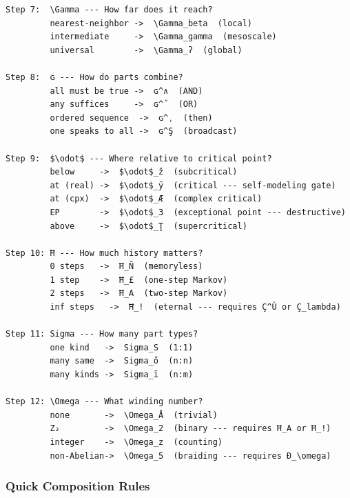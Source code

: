 \documentclass[12pt,a4paper]{article}
\begin{document}
\begin{lstlisting}
Step 7:  \Gamma --- How far does it reach?
         nearest-neighbor ->  \Gamma_beta  (local)
         intermediate     ->  \Gamma_gamma  (mesoscale)
         universal        ->  \Gamma_ʔ  (global)

Step 8:  ɢ --- How do parts combine?
         all must be true ->  ɢ^∧  (AND)
         any suffices     ->  ɢ^˝  (OR)
         ordered sequence  ->  ɢ^ˌ  (then)
         one speaks to all ->  ɢ^Ş  (broadcast)

Step 9:  $\odot$ --- Where relative to critical point?
         below     ->  $\odot$_ž  (subcritical)
         at (real) ->  $\odot$_ÿ  (critical --- self-modeling gate)
         at (cpx)  ->  $\odot$_Æ  (complex critical)
         EP        ->  $\odot$_3  (exceptional point --- destructive)
         above     ->  $\odot$_Ţ  (supercritical)

Step 10: Ħ --- How much history matters?
         0 steps   ->  Ħ_Ñ  (memoryless)
         1 step    ->  Ħ_£  (one-step Markov)
         2 steps   ->  Ħ_A  (two-step Markov)
         inf steps   ->  Ħ_!  (eternal --- requires Ç^Ù or Ç_lambda)

Step 11: Sigma --- How many part types?
         one kind   ->  Sigma_S  (1:1)
         many same  ->  Sigma_ő  (n:n)
         many kinds ->  Sigma_ï  (n:m)

Step 12: \Omega --- What winding number?
         none       ->  \Omega_Å  (trivial)
         Z₂         ->  \Omega_2  (binary --- requires Ħ_A or Ħ_!)
         integer    ->  \Omega_z  (counting)
         non-Abelian->  \Omega_5  (braiding --- requires Ð_\omega)
\end{lstlisting}

\subsubsection{Quick Composition Rules}
\end{document}
